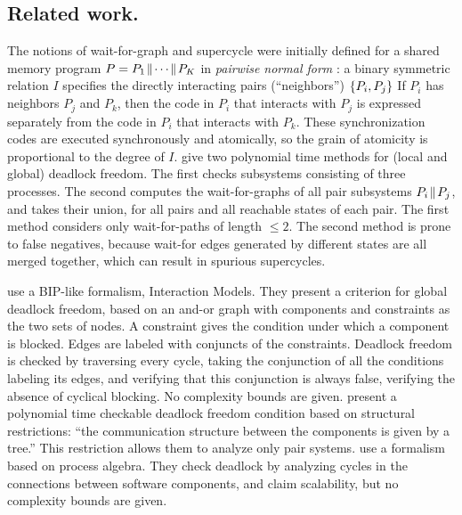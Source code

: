
\subsection{Related work.} 
The notions of wait-for-graph and supercycle \cite{AC05,AE98}
were initially defined for a shared memory program
$P = P_1 \!\parallel\! \cdots \!\parallel\! P_K$ in \emph{pairwise normal form} \cite{Att16a,Att16b}: a binary
symmetric relation $I$ specifies the directly interacting pairs
(``neighbors'') $\{ P_i, P_j \}$ 
If $P_i$ has neighbors $P_j$ and $P_k$, then 
the code in $P_i$ that interacts with $P_j$ is expressed separately from
the code in $P_i$ that interacts with $P_k$. 
These synchronization codes are executed synchronously and
atomically, so the grain of atomicity is proportional to the
degree of $I$.
%
 give two polynomial time 
methods for (local and global) deadlock freedom.
The first checks subsystems consisting of three
processes. The second computes the wait-for-graphs of all pair subsystems $P_i \!\parallel\! P_j$,
and takes their union, for all pairs
and all reachable states of each pair.
The first method considers only wait-for-paths of length $\le 2$. 
The second method is prone to false negatives,
because wait-for edges generated by different states are
all merged together, which can result in spurious supercycles.


 use a BIP-like
formalism, Interaction Models. %
They present a criterion for global deadlock freedom, based on 
an and-or graph with components and constraints as the two sets of nodes. A
constraint gives the condition
under which a component is blocked. Edges are labeled with conjuncts
of the constraints.  Deadlock freedom is checked by traversing every
cycle, taking the conjunction of all the
conditions labeling its edges, and verifying that this conjunction is
always false, \ie verifying the absence of cyclical blocking.
No complexity bounds are given.
%
 present a polynomial time
checkable deadlock freedom condition based on structural restrictions:
``the communication structure between the components is given by a
tree.'' This restriction allows them to analyze only pair systems.
%
 use a 
formalism based on process algebra. They check deadlock by analyzing cycles in
the connections between software components, and claim scalability, but no
complexity bounds are given.

